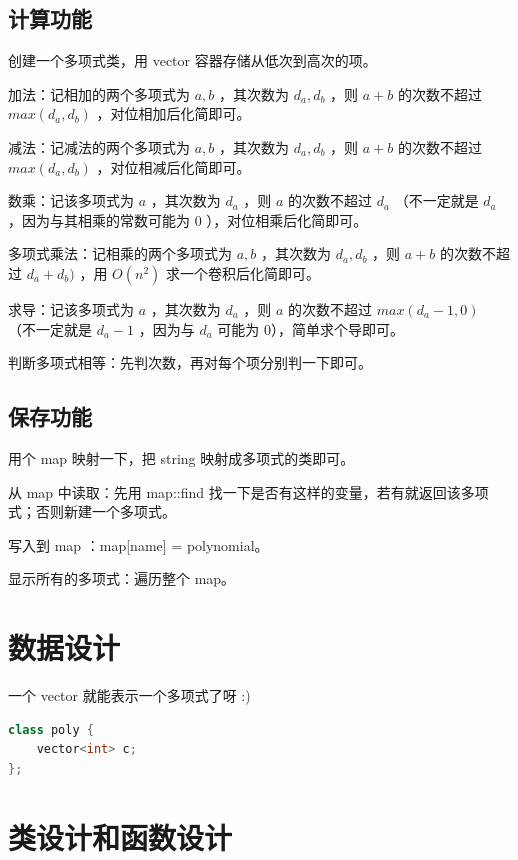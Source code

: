 \documentclass{article}
\begin{document}
\subsection{计算功能}

创建一个多项式类，用 vector 容器存储从低次到高次的项。

加法：记相加的两个多项式为 $a, b$ ，其次数为 $d_a, d_b$ ，则 $a + b$ 的次数不超过 $max(d_a, d_b)$ ，对位相加后化简即可。

减法：记减法的两个多项式为 $a, b$ ，其次数为 $d_a, d_b$ ，则 $a + b$ 的次数不超过 $max(d_a, d_b)$ ，对位相减后化简即可。

数乘：记该多项式为 $a$ ，其次数为 $d_a$ ，则 $a$ 的次数不超过 $d_a$ （不一定就是 $d_a$ ，因为与其相乘的常数可能为 $0$ ），对位相乘后化简即可。

多项式乘法：记相乘的两个多项式为 $a, b$ ，其次数为 $d_a, d_b$ ，则 $a + b$ 的次数不超过 $d_a + d_b)$ ，用 $O(n^2)$ 求一个卷积后化简即可。

求导：记该多项式为 $a$ ，其次数为 $d_a$ ，则 $a$ 的次数不超过 $max(d_a - 1, 0)$ （不一定就是 $d_a - 1$ ，因为与 $d_a$ 可能为 $0$），简单求个导即可。

判断多项式相等：先判次数，再对每个项分别判一下即可。

\subsection{保存功能}

用个 map 映射一下，把 string 映射成多项式的类即可。

从 map 中读取：先用 map::find 找一下是否有这样的变量，若有就返回该多项式；否则新建一个多项式。

写入到 map ：map[name] = polynomial。

显示所有的多项式：遍历整个 map。

\section{数据设计}

一个 vector 就能表示一个多项式了呀 :)

\begin{lstlisting}[language=C++]
class poly {
    vector<int> c;
};
\end{lstlisting}

\section{类设计和函数设计}
\end{document}
